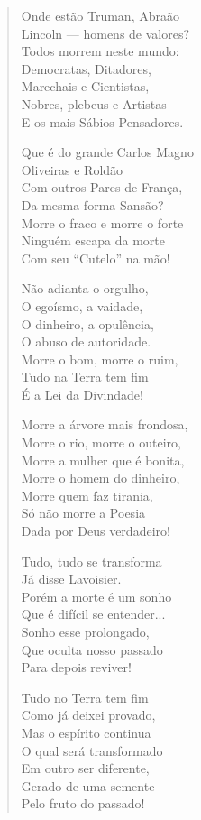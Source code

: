 \begin{verse}
Onde estão Truman, Abraão \\
Lincoln ---  homens de valores? \\
Todos morrem neste mundo: \\
Democratas, Ditadores, \\
Marechais e Cientistas, \\
Nobres, plebeus e Artistas \\
E os mais Sábios Pensadores. 
\pagebreak

Que é do grande Carlos Magno \\
Oliveiras e Roldão \\
Com outros Pares de França, \\
Da mesma forma Sansão? \\
Morre o fraco e morre o forte \\
Ninguém escapa da morte \\
Com seu ``Cutelo'' na mão! 

Não adianta o orgulho, \\
O egoísmo, a vaidade, \\
O dinheiro, a opulência, \\
O abuso de autoridade. \\
Morre o bom, morre o ruim, \\
Tudo na Terra tem fim \\
É a Lei da Divindade! 

Morre a árvore mais frondosa, \\
Morre o rio, morre o outeiro, \\
Morre a mulher que é bonita, \\
Morre o homem do dinheiro, \\
Morre quem faz tirania, \\
Só não morre a Poesia \\
Dada por Deus verdadeiro! 

Tudo, tudo se transforma \\
Já disse Lavoisier. \\
Porém a morte é um sonho \\
Que é difícil se entender... \\
Sonho esse prolongado, \\
Que oculta nosso passado \\
Para depois reviver! 
\pagebreak

Tudo no Terra tem fim \\
Como já deixei provado, \\
Mas o espírito continua \\
O qual será transformado \\
Em outro ser diferente, \\
Gerado de uma semente \\
Pelo fruto do passado! 


\end{verse}
